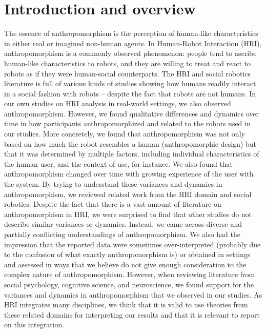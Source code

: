 \documentclass{frontiersSCNS} %
\begin{document}
\section*{Introduction and overview}
\label{sec:intro}

The essence of anthropomorphism is the perception of human-like characteristics in either real or imagined non-human agents. In Human-Robot Interaction (HRI), anthropomorphism is a commonly observed phenomenon: people tend to ascribe human-like characteristics to robots, and they are willing to treat and react to robots as if they were human-social counterparts. The HRI and social robotics literature is full of various kinds of studies showing how humans readily interact in a social fashion with robots -- despite the fact that robots are not humans. In our own studies on HRI analysis in real-world settings, we also observed anthropomorphism. However, we found qualitative differences and dynamics over time in how participants anthropomorphized and related to the robots used in our studies. More concretely, we found that anthropomorphism was not only based on how much the robot resembles a human (anthropomorphic design) but that it was determined by multiple factors, including individual characteristics of the human user, and the context of use, for instance. We also found that anthropomorphism changed over time with growing experience of the user with the system. By trying to understand these variances and dynamics in anthropomorphism, we reviewed related work from the HRI domain and social robotics. Despite the fact that there is a vast amount of literature on anthropomorphism in HRI, we were surprised to find that other studies do not describe similar variances or dynamics. Instead, we came across diverse and partially conflicting understandings of anthropomorphism. We also had the impression that the reported data were sometimes over-interpreted (probably due to the confusion of what exactly anthropomorphism is) or obtained in settings and assessed in ways that we believe do not give enough consideration to the complex nature of anthropomorphism. However, when reviewing literature from social psychology, cognitive science, and neuroscience, we found support for the variances and dynamics in anthropomorphism that we observed in our studies. As HRI integrates many disciplines, we think that it is valid to use theories from these related domains for interpreting our results and that it is relevant to report on this integration.
\end{document}
